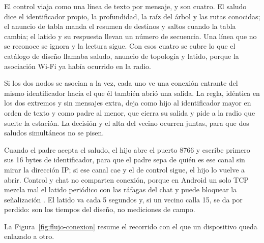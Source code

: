 \documentclass[12pt,oneside]{scrreprt}
\begin{document}
El control viaja como una línea de texto por mensaje, y son cuatro. El saludo dice el identificador propio, la profundidad, la raíz del árbol y las rutas conocidas; el anuncio de tabla manda el resumen de destinos y saltos cuando la tabla cambia; el latido y su respuesta llevan un número de secuencia. Una línea que no se reconoce se ignora y la lectura sigue. Con esos cuatro se cubre lo que el catálogo de diseño llamaba saludo, anuncio de topología y latido, porque la asociación Wi-Fi ya había ocurrido en la radio.

Si los dos nodos se asocian a la vez, cada uno ve una conexión entrante del mismo identificador hacia el que él también abrió una salida. La regla, idéntica en los dos extremos y sin mensajes extra, deja como hijo al identificador mayor en orden de texto y como padre al menor, que cierra su salida y pide a la radio que suelte la estación. La decisión y el alta del vecino ocurren juntas, para que dos saludos simultáneos no se pisen.

Cuando el padre acepta el saludo, el hijo abre el puerto 8766 y escribe primero sus 16 bytes de identificador, para que el padre sepa de quién es ese canal sin mirar la dirección IP; si ese canal cae y el de control sigue, el hijo lo vuelve a abrir. Control y chat no comparten conexión, porque en Android un solo TCP mezcla mal el latido periódico con las ráfagas del chat y puede bloquear la señalización \parencite{AndroidDevelopers2024}. El latido va cada 5 segundos y, si un vecino calla 15, se da por perdido: son los tiempos del diseño, no mediciones de campo.

La Figura~\ref{fig:flujo-conexion} resume el recorrido con el que un dispositivo queda enlazado a otro.
\end{document}
